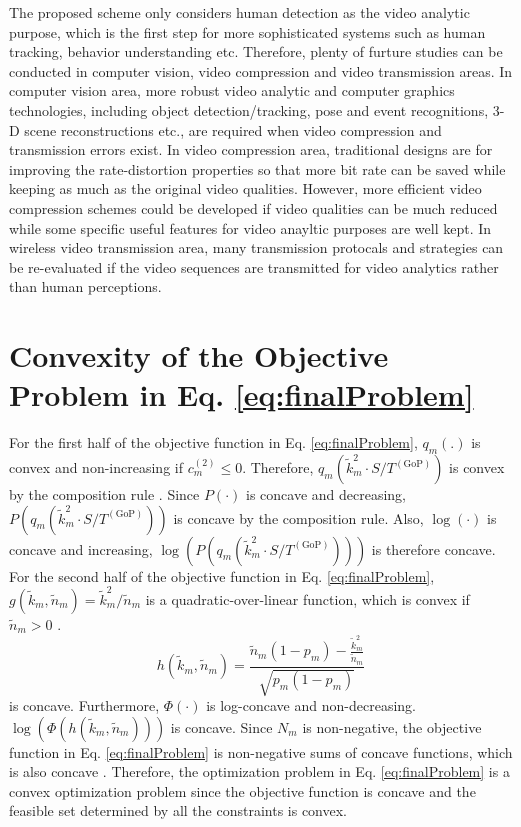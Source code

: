 \documentclass[journal]{IEEEtran}
\begin{document}
The proposed scheme only considers human detection as the video analytic purpose, which is the first step for more sophisticated systems such as human tracking, behavior understanding etc. Therefore, plenty of furture studies can be conducted in computer vision, video compression and video transmission areas. In computer vision area, more robust video analytic and computer graphics technologies, including object detection/tracking, pose and event recognitions, 3-D scene reconstructions etc., are required when video compression and transmission errors exist. In video compression area, traditional designs are for improving the rate-distortion properties so that more bit rate can be saved while keeping as much as the original video qualities. However, more efficient video compression schemes could be developed if video qualities can be much reduced while some specific useful features for video anayltic purposes are well kept. In wireless video transmission area, many transmission protocals and strategies can be re-evaluated if the video sequences are transmitted for video analytics rather than human perceptions.
\appendices
\section{Convexity of the Objective Problem in Eq. \eqref{eq:finalProblem}}
For the first half of the objective function in Eq. \eqref{eq:finalProblem}, $q_m\left(.\right)$ is convex and non-increasing if $c_m^{\left(2\right)}\leq 0$. Therefore, $q_m\left(\tilde{k}_m^2\cdot S/T^{\left(\text{GoP}\right)}\right)$ is convex by the composition rule \cite{BoVa04}. Since $P\left(\cdot \right)$ is concave and decreasing, $P\left(q_m\left(\tilde{k}_m^2\cdot S/T^{\left(\text{GoP}\right)}\right)\right)$ is concave by the composition rule. Also, $\log\left(\cdot\right)$ is concave and increasing, $\log\left(P\left(q_m\left(\tilde{k}_m^2\cdot S/T^{\left(\text{GoP}\right)}\right)\right)\right)$ is therefore concave. For the second half of the objective function in Eq. \eqref{eq:finalProblem}, $g\left(\tilde{k}_m,\tilde{n}_m\right)=\tilde{k}^2_m/\tilde{n}_m$ is a quadratic-over-linear function, which is convex if $\tilde{n}_m>0$ \cite{BoVa04}. 
\begin{equation}
h\left(\tilde{k}_m,\tilde{n}_m\right) = \frac{\tilde{n}_m\left(1-p_m\right)-\frac{\tilde{k}_m^2}{\tilde{n}_m}}{\sqrt{p_m\left(1-p_m\right)}}
\end{equation}
is concave. Furthermore, $\Phi\left(\cdot\right)$ is log-concave \cite{BoVa04} and non-decreasing. $\log\left(\Phi\left(h\left(\tilde{k}_m,\tilde{n}_m\right)\right)\right)$ is concave. Since $N_m$ is non-negative, the objective function in Eq. \eqref{eq:finalProblem} is non-negative sums of concave functions, which is also concave \cite{BoVa04}. Therefore, the optimization problem in Eq. \eqref{eq:finalProblem} is a convex optimization problem since the objective function is concave and the feasible set determined by all the constraints is convex.








\end{document}
